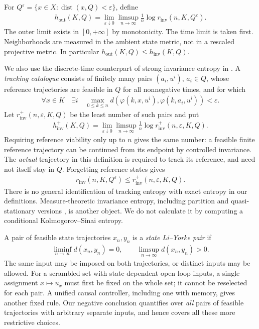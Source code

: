 \documentclass[11pt,a4paper]{article}
\theoremstyle{definition}
\theoremstyle{remark}
\begin{document}
For \(Q^\varepsilon=\{x\in X:\operatorname{dist}(x,Q)<\varepsilon\}\), define
\begin{align}\label{eq:outer}
 h_{\mathrm{out}}(K,Q)=\lim_{\varepsilon\downarrow0}\limsup_{n\to\infty}
 \frac1n\log r_{\mathrm{inv}}(n,K,Q^\varepsilon).
\end{align}
The outer limit exists in \([0,+\infty]\) by monotonicity. The time limit is taken first. Neighborhoods are measured in the ambient state metric, not in a rescaled projective metric. In particular \(h_{\mathrm{out}}(K,Q)\leq h_{\mathrm{inv}}(K,Q)\).

We also use the discrete-time counterpart of strong invariance entropy in \cite[Definition 3.1.1]{K2009}. A \emph{tracking catalogue} consists of finitely many pairs \((a_i,u^i)\), \(a_i\in Q\), whose reference trajectories are feasible in \(Q\) for all nonnegative times, and for which
\begin{align*}
 \forall x\in K\quad\exists i\quad
 \max_{0\leq k\leq n}
 d(\varphi(k,x,u^i),\varphi(k,a_i,u^i))<\varepsilon.
\end{align*}
Let \(r_{\mathrm{inv}}^{+}(n,\varepsilon,K,Q)\) be the least number of such pairs and put
\begin{align*}
 h_{\mathrm{inv}}^{+}(K,Q)=\lim_{\varepsilon\downarrow0}\limsup_{n\to\infty}
 \frac1n\log r_{\mathrm{inv}}^{+}(n,\varepsilon,K,Q).
\end{align*}
Requiring reference viability only up to \(n\) gives the same number: a feasible finite reference trajectory can be continued from its endpoint by controlled invariance. The \emph{actual} trajectory in this definition is required to track its reference, and need not itself stay in \(Q\). Forgetting reference states gives
\begin{align}\label{eq:outer-tracking}
 r_{\mathrm{inv}}(n,K,Q^\varepsilon)\leq r_{\mathrm{inv}}^{+}(n,\varepsilon,K,Q).
\end{align}
There is no general identification of tracking entropy with exact entropy in our definitions. Measure-theoretic invariance entropy, including partition and quasi-stationary versions \cite{WHS2019,NWH2022,CQuasi2018}, is another object. We do not calculate it by computing a conditional Kolmogorov--Sinai entropy.

A pair of feasible state trajectories \(x_n,y_n\) is a \emph{state Li--Yorke pair} if
\begin{align*}
 \liminf_{n\to\infty}d(x_n,y_n)=0,\qquad
 \limsup_{n\to\infty}d(x_n,y_n)>0.
\end{align*}
The same input may be imposed on both trajectories, or distinct inputs may be allowed. For a scrambled set with state-dependent open-loop inputs, a single assignment \(x\mapsto u_x\) must first be fixed on the whole set; it cannot be reselected for each pair. A unified causal controller, including one with memory, gives another fixed rule. Our negative conclusion quantifies over \emph{all} pairs of feasible trajectories with arbitrary separate inputs, and hence covers all these more restrictive choices.
\end{document}
